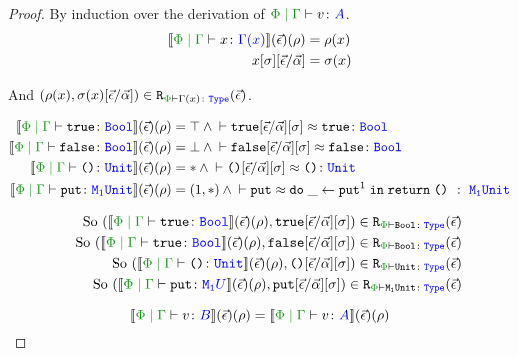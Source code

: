 \begin{framed}
    \begin{proof}
        By induction over the derivation of $\gpetyperelation{v}{A}$.
            \begin{align*}
                \deno{\gpetyperelation{x}{\G(x)}}\fundRho & = \rho(x) \\
                x\ssi\ssub{\av}{\ev} & = \si(x)\\
            \end{align*}
        
            And $\inLogRelPE{\rho(x)}{\si(x)\ssub{\av}{\ev}}{\G(x)}$.
        
            \begin{align*}
                \deno{\gpetyperelation{\t}{\B}}\fundRho & = \top \wedge \zberelation{\t\fundSub}{\t}{\B} 
                \\ 
                \deno{\gpetyperelation{\f}{\B}}\fundRho & = \bot \wedge \zberelation{\f\fundSub}{\f}{\B}
                \\ 
                \deno{\gpetyperelation{\u}{\U}}\fundRho & = \singleton \wedge \zberelation{\u\fundSub}{\u}{\U}
                \\
                \deno{\gpetyperelation{\put}{\M{1}{\U}}}\fundRho & = (1, \singleton)\wedge \zberelation{\put}{\doin{\_}{\put^1}{\return{\u}}}{\s\M{\1}{\U}}
                \\
            \end{align*}
        
            \begin{align*}
                \qt{ So } \inLogRelPE{\deno{\gpetyperelation{\t}{\B}}\fundRho}{\t\fundSub}{\B}
                \\
                \qt{ So } \inLogRelPE{\deno{\gpetyperelation{\t}{\B}}\fundRho}{\f\fundSub}{\B}
                \\
                \qt{ So } \inLogRelPE{\deno{\gpetyperelation{\u}{\U}}\fundRho}{\u\fundSub}{\U}
                \\
                \qt{So }\inLogRelPE{\deno{\gpetyperelation{\put}{\M{\1}{U}}}\fundRho}{\put\fundSub}{\M{\1}{\U}}
                \\ 
            \end{align*}
        
            \case{\vsubtype}
        
            \begin{equation}
                \deno{\gpetyperelation{v}{B}}\fundRho = \deno{\gpetyperelation{v}{A}}\fundRho
            \end{equation}
        

\end{proof}
\end{framed}
